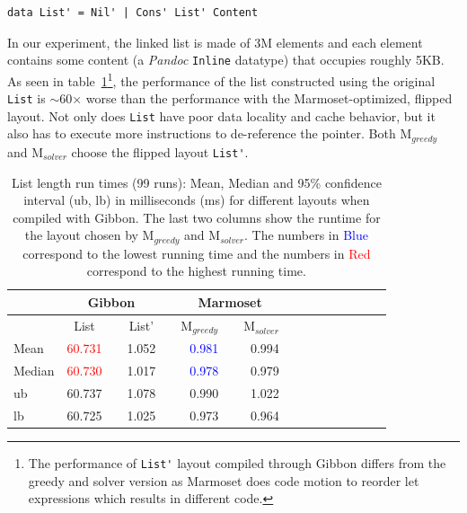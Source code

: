 \documentclass[acmsmall,review,anonymous]{acmart}\settopmatter{printfolios=true,printccs=false,printacmref=false}
\newcommand{\system}{{\sc Marmoset}\xspace}
\newcommand{\systemSolver}{{\sc M$_{\mathit{solver}}$}\xspace}
\newcommand{\systemGreedy}{{\sc M$_{\mathit{greedy}}$}\xspace}
\newcommand{\gibbon}{{\sc Gibbon}\xspace}
\newcommand{\ra}[1]{\renewcommand{\arraystretch}{#1}}
\begin{document}
\begin{lstlisting}
data List' = Nil' | Cons' List' Content
\end{lstlisting}

In our experiment, the linked list is made of 3M elements and each element contains some
content (a \textit{Pandoc} \lstinline|Inline| datatype) that occupies roughly 5KB.
As seen in table~\ref{table:Measure-Length}\footnote{The performance of \lstinline|List'| layout compiled through \gibbon differs from the greedy and solver version as \system does code motion to reorder let expressions which results in different code.}, the performance of the list constructed using the original \lstinline{List} is $\sim$60$\times$ worse than the performance with the \system-optimized, flipped layout.
Not only does \lstinline{List} have poor data locality and cache behavior,
but it also has to execute more instructions to de-reference the pointer.
Both \systemGreedy and \systemSolver choose the flipped layout \lstinline|List'|.




\begin{table}[]
	\setlength{\tabcolsep}{2pt} \centering
	\ra{1}
	\caption{List length run times (99 runs): Mean, Median and 95\% confidence interval (ub, lb) in milliseconds (ms) for different
	layouts when compiled with \gibbon. The last two columns show the runtime for the layout chosen by
	\systemGreedy and \systemSolver.
	The numbers in \textcolor{blue}{Blue} correspond to the lowest running time and the numbers in \textcolor{red}{Red} correspond to the highest running time.
	}
	\begin{tabular}{@{}p{0.6in}rcrcrcrcrcrcrcr@{}}\toprule
	 & \multicolumn{3}{|c|}{{\gibbon}} &
	 & \multicolumn{3}{c|}{{\system}}\\ \midrule
		
	 & \multicolumn{1}{c}{{List}} &
	 & \multicolumn{1}{c}{{List'}} &
	 & \multicolumn{1}{c}{\small{\systemGreedy}} &
	 & \multicolumn{1}{c}{\small{\systemSolver}}\\ \midrule
	Mean
	         & \textcolor{red}{60.731}&&  {1.052}&&  \textcolor{blue}{0.981} &&  {0.994} \\
	Median
	         &  \textcolor{red}{60.730}&&   {1.017}&&   \textcolor{blue}{0.978} &&   {0.979}\\
ub
	               &  {60.737}&&   {1.078}&&   {0.990}&&   {1.022}\\
	lb
	               &  {60.725}&&   {1.025}&&   {0.973} &&   {0.964}\\
	\bottomrule
	\end{tabular}
	\label{table:Measure-Length}
\end{table}
\end{document}

